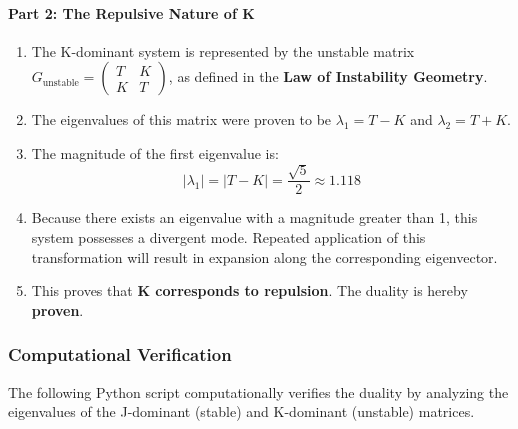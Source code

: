 \paragraph{Part 2: The Repulsive Nature of K}
\begin{enumerate}
    \item The K-dominant system is represented by the unstable matrix $G_{\text{unstable}} = \begin{pmatrix} T & K \\ K & T \end{pmatrix}$, as defined in the \textbf{Law of Instability Geometry}.
    \item The eigenvalues of this matrix were proven to be $\lambda_1 = T-K$ and $\lambda_2 = T+K$.
    \item The magnitude of the first eigenvalue is:
    $$ |\lambda_1| = |T-K| = \frac{\sqrt{5}}{2} \approx 1.118 $$
    \item Because there exists an eigenvalue with a magnitude greater than 1, this system possesses a divergent mode. Repeated application of this transformation will result in expansion along the corresponding eigenvector.
    \item This proves that \textbf{K corresponds to repulsion}. The duality is hereby \textbf{proven}.
\end{enumerate}

\subsubsection*{Computational Verification}
The following Python script computationally verifies the duality by analyzing the eigenvalues of the J-dominant (stable) and K-dominant (unstable) matrices.

